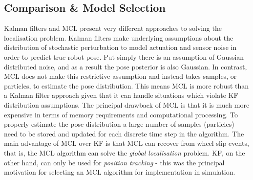 \documentclass[a4paper]{article}
\begin{document}
\subsection{Comparison \& Model Selection}
Kalman filters and MCL present very different approaches to solving the localisation problem. Kalman filters make underlying assumptions about the distribution of stochastic perturbation to model actuation and sensor noise in order to predict true robot pose. Put simply there is an assumption of Gaussian distributed noise, and as a result the pose posterior is also Gaussian. In contrast, MCL does not make this restrictive assumption and instead takes samples, or particles, to estimate the pose distribution. This means MCL is more robust than a Kalman filter approach given that it can handle situations which violate KF distribution assumptions. The principal drawback of MCL is that it is much more expensive in terms of memory requirements and computational processing. To properly estimate the pose distribution a large number of samples (particles) need to be stored and updated for each discrete time step in the algorithm. The main advantage of MCL over KF is that MCL can recover from wheel slip events, that is, the MCL algorithm can solve the \textit{global localisation} problem. KF, on the other hand, can only be used for \textit{position tracking} - this was the principal motivation for selecting an MCL algorithm for implementation in simulation.
\end{document}
